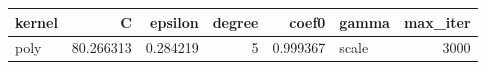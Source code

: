 \begin{tabular}{lrrrrlr}
\toprule
kernel & C & epsilon & degree & coef0 & gamma & max_iter \\
\midrule
poly & 80.266313 & 0.284219 & 5 & 0.999367 & scale & 3000 \\
\bottomrule
\end{tabular}
